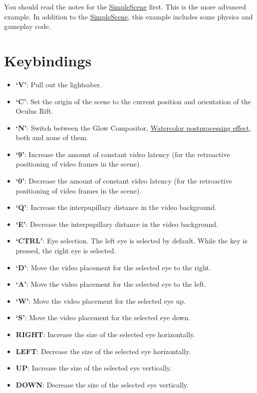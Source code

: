 \documentclass[]{article}
\begin{document}
You should read the notes for the
\href{https://github.com/ands/OculusMeetsAR/wiki/SimpleScene}{SimpleScene}
first. This is the more advanced example. In addition to the
\href{https://github.com/ands/OculusMeetsAR/wiki/SimpleScene}{SimpleScene},
this example includes some physics and gameplay code.

\section{Keybindings}\label{keybindings}

\begin{itemize}
\itemsep1pt\parskip0pt
\item
  \textbf{`V'}: Pull out the lightsaber.
\item
  \textbf{`C'}: Set the origin of the scene to the current position and
  orientation of the Oculus Rift.
\item
  \textbf{`N'}: Switch between the Glow Compositor,
  \href{https://github.com/ands/OculusMeetsAR/wiki/Postprocessing}{Watercolor
  postprocessing effect}, both and none of them.
\item
  \textbf{`9'}: Increase the amount of constant video latency (for the
  retroactive positioning of video frames in the scene).
\item
  \textbf{`0'}: Decrease the amount of constant video latency (for the
  retroactive positioning of video frames in the scene).
\item
  \textbf{`Q'}: Increase the interpupillary distance in the video
  background.
\item
  \textbf{`E'}: Decrease the interpupillary distance in the video
  background.
\item
  \textbf{`CTRL'}: Eye selection. The left eye is selected by default.
  While the key is pressed, the right eye is selected.
\item
  \textbf{`D'}: Move the video placement for the selected eye to the
  right.
\item
  \textbf{`A'}: Move the video placement for the selected eye to the
  left.
\item
  \textbf{`W'}: Move the video placement for the selected eye up.
\item
  \textbf{`S'}: Move the video placement for the selected eye down.
\item
  \textbf{RIGHT}: Increase the size of the selected eye horizontally.
\item
  \textbf{LEFT}: Decrease the size of the selected eye horizontally.
\item
  \textbf{UP}: Increase the size of the selected eye vertically.
\item
  \textbf{DOWN}: Decrease the size of the selected eye vertically.

   
\end{itemize}
\end{document}
